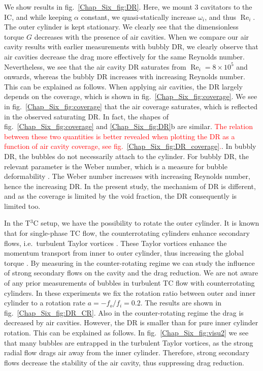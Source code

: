 \documentclass[aps,onecolumn,10pt, floatfix, superscriptaddress,longbibliography, pra]{revtex4-1}
\newcommand{\red}[1]{\textcolor{red}{#1}}
\renewcommand{\Re}{\operatorname{Re}}
\begin{document}
We show results in fig.\ \ref{Chap_Six_fig:DR}. Here, we mount 3 cavitators to the IC, and while keeping $\alpha$ constant, we quasi-statically increase $\omega_i$, and thus $\Re_i$. The outer cylinder is kept stationary. We clearly see that the dimensionless torque $G$ decreases with the presence of air cavities. When we compare our air cavity results with earlier measurements with bubbly DR, we clearly observe that air cavities decrease the drag more effectively for the same Reynolds number. 
Nevertheless, we see that the air cavity DR saturates from $\Re_i=8\times10^5$ and onwards, whereas the bubbly DR increases with increasing Reynolds number. This can be explained as follows. When applying air cavities, the DR largely depends on the coverage, which is shown in fig.\ \ref{Chap_Six_fig:coverage}. We see in fig.\ \ref{Chap_Six_fig:coverage} that the air coverage saturates, which is reflected in the observed saturating DR. In fact, the shapes of fig.\ \ref{Chap_Six_fig:coverage} and \ref{Chap_Six_fig:DR}b are similar. \red{The relation between these two quantities is better revealed when plotting the DR as a function of air cavity coverage, see fig.\ \ref{Chap_Six_fig:DR_coverage}.}.
In bubbly DR, the bubbles do not necessarily attach to the cylinder. For bubbly DR, the relevant parameter is the Weber number, which is a measure for bubble deformability \citep{gil13}. The Weber number increases with increasing Reynolds number, hence the increasing DR. In the present study, the mechanism of DR is different, and as the coverage is limited by the void fraction, the DR consequently is limited too.

In the T$^3$C setup, we have the possibility to rotate the outer cylinder. It is known that for single-phase TC flow, the counterrotating cylinders enhance secondary flows, i.e.\ turbulent Taylor vortices \citep{gil12,ost14pd,gro16}. These Taylor vortices enhance the momentum transport from inner to outer cylinder, thus increasing the global torque \citep{gil11}.  By measuring in the counter-rotating regime we can study the influence of strong secondary flows on the cavity and the drag reduction.  We are not aware of any prior measurements of bubbles in turbulent TC flow with counterrotating cylinders. In these experiments we fix the rotation ratio between outer and inner cylinder to a rotation rate $a = -f_o/f_i=0.2$. 
The results are shown in fig.\ \ref{Chap_Six_fig:DR_CR}. Also in the counter-rotating regime the drag is decreased by air cavities. However, the DR is smaller than for pure inner cylinder rotation. This can be explained as follows.
In fig.\ \ref{Chap_Six_fig:visu2} we see that many bubbles are entrapped in the turbulent Taylor vortices, as the strong radial flow drags air away from the inner cylinder. Therefore, strong secondary flows decrease the stability of the air cavity, thus suppressing drag reduction. 
\end{document}
